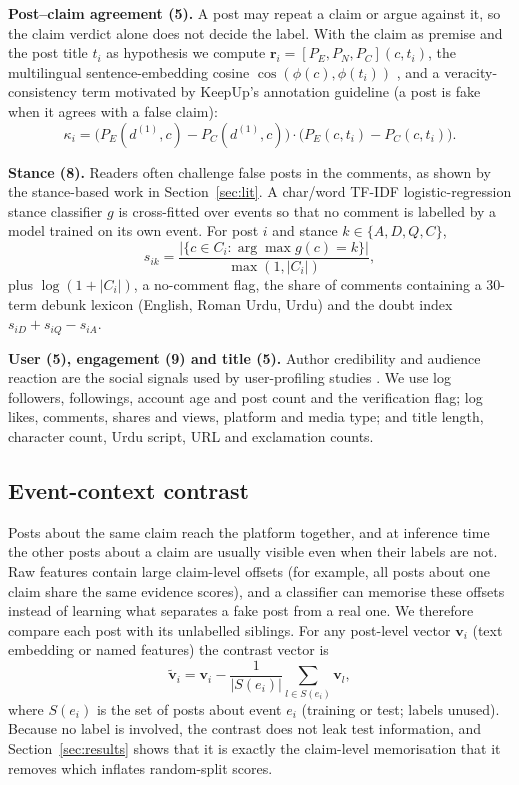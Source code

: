 \documentclass[conference]{IEEEtran}
\begin{document}
\textbf{Post--claim agreement (5).} A post may repeat a claim or argue against it, so the claim verdict alone
does not decide the label. With the claim as premise and the post title $t_i$ as hypothesis we compute
$\mathbf{r}_i=[P_E,P_N,P_C](c, t_i)$, the multilingual sentence-embedding cosine
$\cos(\phi(c),\phi(t_i))$ \cite{reimers2020multilingual}, and a veracity-consistency term motivated by
KeepUp's annotation guideline (a post is fake when it agrees with a false claim):
\begin{equation}
\kappa_i=\big(P_E(d^{(1)},c)-P_C(d^{(1)},c)\big)\cdot\big(P_E(c,t_i)-P_C(c,t_i)\big).
\label{eq:consistency}
\end{equation}

\textbf{Stance (8).} Readers often challenge false posts in the comments, as shown by the stance-based work in
Section~\ref{sec:lit}. A char/word TF-IDF logistic-regression stance classifier $g$ is cross-fitted over
events so that no comment is labelled by a model trained on its own event. For post $i$ and stance
$k\in\{A,D,Q,C\}$,
\begin{equation}
s_{ik}=\frac{|\{c\in C_i:\arg\max g(c)=k\}|}{\max(1,|C_i|)},
\label{eq:stance}
\end{equation}
plus $\log(1+|C_i|)$, a no-comment flag, the share of comments containing a 30-term debunk lexicon
(English, Roman Urdu, Urdu) and the doubt index $s_{iD}+s_{iQ}-s_{iA}$.

\textbf{User (5), engagement (9) and title (5).} Author credibility and audience reaction are the social
signals used by user-profiling studies \cite{almutair2025msdsi,nivedita2026hgcm}. We use log followers,
followings, account age and post count and the verification flag; log likes, comments, shares and views,
platform and media type; and title length, character count, Urdu script, URL and exclamation counts.

\subsection{Event-context contrast}
Posts about the same claim reach the platform together, and at inference time the other posts about a claim
are usually visible even when their labels are not. Raw features contain large claim-level offsets (for
example, all posts about one claim share the same evidence scores), and a classifier can memorise these offsets
instead of learning what separates a fake post from a real one. We therefore compare each post with its
unlabelled siblings. For any post-level vector $\mathbf{v}_i$ (text embedding or named features) the contrast
vector is
\begin{equation}
\tilde{\mathbf{v}}_{i}=\mathbf{v}_{i}-\frac{1}{|S(e_i)|}\sum_{l\in S(e_i)}\mathbf{v}_{l},
\label{eq:contrast}
\end{equation}
where $S(e_i)$ is the set of posts about event $e_i$ (training or test; labels unused). Because no label is
involved, the contrast does not leak test information, and Section~\ref{sec:results} shows that it is exactly
the claim-level memorisation that it removes which inflates random-split scores.
\end{document}
